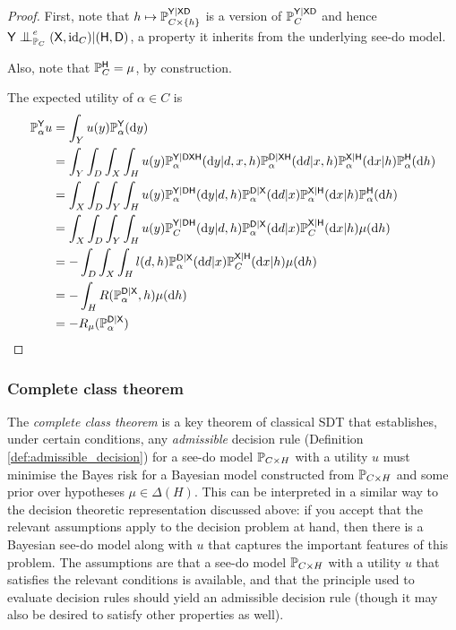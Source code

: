 \begin{proof}
First, note that $h\mapsto \mathbb{P}_{C\times \{h\}}^{\mathsf{Y}|\mathsf{XD}}$ is a version of $\mathbb{P}_C^{\mathsf{Y}|\mathsf{XD}}$ and hence $\RV{Y}\CI^e_{\prob{P}_C} (\RV{X},\text{id}_C)|(\RV{H},\RV{D})$, a property it inherits from the underlying see-do model.

Also, note that $\mathbb{P}_C^{\mathsf{H}}=\mu$, by construction.

The expected utility of $\alpha\in C$ is 
\begin{align}
    \mathbb{P}_\alpha^{\mathsf{Y}} u &= \int_Y u(y) \mathbb{P}_{\alpha}^{\mathsf{Y}}(\mathrm{d}y) \\
    &= \int_Y  \int_D \int_{X} \int_H u(y)\mathbb{P}_{\alpha}^{\mathsf{Y}|\mathsf{DXH}}(\mathrm{d}y|d,x,h)\mathbb{P}_{\alpha}^{\mathsf{D}|\mathsf{XH}}(\mathrm{d}d|x,h)\mathbb{P}_{\alpha}^{\mathsf{X}|\mathsf{H}}(\mathrm{d}x|h)\mathbb{P}_\alpha^{\mathsf{H}}(\mathrm{d}h) \\
    &= \int_X  \int_D \int_{Y} \int_H u(y) \mathbb{P}_{\alpha}^{\mathsf{Y}|\mathsf{DH}}(\mathrm{d}y|d,h)\mathbb{P}_{\alpha}^{\mathsf{D}|\mathsf{X}}(\mathrm{d}d|x)\mathbb{P}_{\alpha}^{\mathsf{X}|\mathsf{H}}(\mathrm{d}x|h)\mathbb{P}_\alpha^{\mathsf{H}}(\mathrm{d}h)\\
    &=  \int_X  \int_D \int_{Y} \int_H u(y) \mathbb{P}_{C}^{\mathsf{Y}|\mathsf{DH}}(\mathrm{d}y|d,h)\mathbb{P}_{\alpha}^{\mathsf{D}|\mathsf{X}}(\mathrm{d}d|x)\mathbb{P}_{C}^{\mathsf{X}|\mathsf{H}}(\mathrm{d}x|h)\mu(\mathrm{d}h)\\
     &= -\int_D\int_X\int_H l(d,h)\mathbb{P}_{\alpha}^{\mathsf{D}|\mathsf{X}}(\mathrm{d}d|x)\mathbb{P}_{C}^{\mathsf{X}|\mathsf{H}}(\mathrm{d}x|h)\mu(\mathrm{d}h)\\
    &= -\int_H R(\mathbb{P}_{\alpha}^{\mathsf{D}|\mathsf{X}},h)\mu(\mathrm{d}h)\\
    &= -R_{\mu}(\mathbb{P}_{\alpha}^{\mathsf{D}|\mathsf{X}})
\end{align}
\end{proof}

\subsubsection{Complete class theorem}\label{sec:cc_theorem}

The \emph{complete class theorem} is a key theorem of classical SDT that establishes, under certain conditions, any \emph{admissible} decision rule (Definition \ref{def:admissible_decision}) for a see-do model $\mathbb{P}_{C\times H}$ with a utility $u$ must minimise the Bayes risk for a Bayesian model constructed from $\mathbb{P}_{C\times H}$ and some prior over hypotheses $\mu\in \Delta(H)$. This can be interpreted in a similar way to the decision theoretic representation discussed above: if you accept that the relevant assumptions apply to the decision problem at hand, then there is a Bayesian see-do model along with $u$ that captures the important features of this problem. The assumptions are that a see-do model $\mathbb{P}_{C\times H}$ with a utility $u$ that satisfies the relevant conditions is available, and that the principle used to evaluate decision rules should yield an admissible decision rule (though it may also be desired to satisfy other properties as well).

